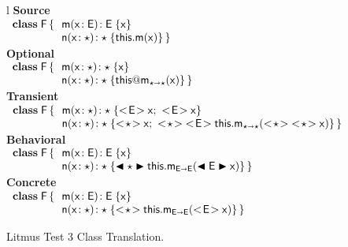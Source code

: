 \documentclass[runnningheads]{tex/llncs}
\begin{document}
\begin{figure}[!h]
  \begin{tabular}{l}
    {\scriptsize\bf{Source}} \\
\(
\begin{array}{l@{\,}l}
\Class{\xt F}{}{&\Mdef\m\x{\xt E}{\xt E}\x \\
                &\Mdef\n\x\any\any{\Call\this\m\x}} \\
\end{array}
\) \\
    {\scriptsize\bf{Optional}} \\ 
\(
\begin{array}{l@{\,}l}
\Class{\xt F}{}{&\Mdef\m\x{\any}{\any}\x \\
                &\Mdef\n\x\any\any{\DynCall\this\m\x}} \\
\end{array}
\) \\
    {\scriptsize\bf{Transient}} \\
\(
\begin{array}{l@{\,}l}
\Class{\xt F}{}{&\Mdef\m\x\any\any{\idbody{\xt E}} \\
                &\Mdef\n\x\any\any{\SubCast{\any}{\x}\sspce 
                \SubCast{\any}{\SubCast{\xt E}{\KCall\this\m{\SubCast\any{\SubCast\any\x}}\any\any}}}} \\
\end{array}
\)\\
    {\scriptsize\bf{Behavioral}} \\
\(
\begin{array}{l@{\,}l}
\Class{\xt F}{}{&\Mdef\m\x{\xt E}{\xt E}\x \\
                &\Mdef\n\x\any\any{\BehCast\any{\KCall\this\m{\BehCast{\xt E}\x}{\xt E}{\xt E}}}} \\
\end{array}
\) \\
    {\scriptsize\bf{Concrete}} \\
\(
\begin{array}{l@{\,}l}
\Class{\xt F}{}{&\Mdef\m\x{\xt E}{\xt E}\x \\
                &\Mdef\n\x\any\any{\SubCast\any{\KCall\this\m{\SubCast{\xt E}\x}{\xt E}{\xt E}}}} \\
\end{array}
\) \\
  \end{tabular}
  
 \caption{Litmus Test 3 Class Translation.} \label{fig:l3trans}
\end{figure}
\end{document}
